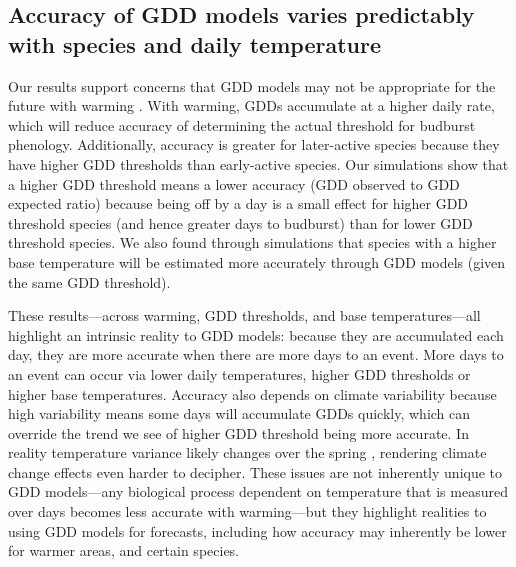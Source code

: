 \documentclass{article}\usepackage[]{graphicx}\usepackage[]{color}
\begin{document}
\subsection*{Accuracy of GDD models varies predictably with species and daily temperature} 
Our results support concerns that GDD models may not be appropriate for the future with warming \citep{Man2010}. With warming, GDDs accumulate at a higher daily rate, which will reduce accuracy of determining the actual threshold for budburst phenology. Additionally, accuracy is greater for later-active species because they have higher GDD thresholds than early-active species. Our simulations show that a higher GDD threshold means a lower accuracy (GDD observed to GDD expected ratio) because being off by a day is a small effect for higher GDD threshold species (and hence greater days to budburst) than for lower GDD threshold species. We also found through simulations that species with a higher base temperature will be estimated more accurately through GDD models (given the same GDD threshold). 

These results---across warming, GDD thresholds, and base temperatures---all highlight an intrinsic reality to GDD models: because they are accumulated each day, they are more accurate when there are  more days to an event. More days to an event can occur via lower daily temperatures, higher GDD thresholds or higher base temperatures. Accuracy also depends on climate variability because high variability means some days will accumulate GDDs quickly, which can override the trend we see of higher GDD threshold being more accurate. In reality temperature variance likely changes over the spring \citep{Qu2014}, rendering climate change effects even harder to decipher. These issues are not inherently unique to GDD models---any biological process dependent on temperature that is measured over days becomes less accurate with warming---but they highlight realities to using GDD models for forecasts, including how accuracy may inherently be lower for warmer areas, and certain species. 
\end{document}
